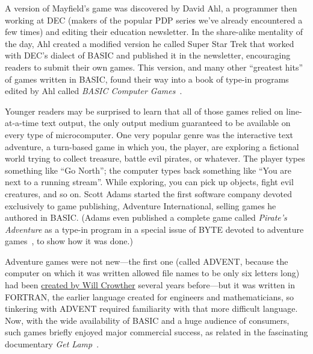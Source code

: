 A version of Mayfield's game
was discovered by David Ahl, a programmer
then working at DEC (makers of the popular PDP series we've already
encountered a few times) and editing their education newsletter.
In the share-alike mentality of the day, Ahl created a modified
version he called Super Star Trek that worked with DEC's dialect of
BASIC and published it in the
newsletter, encouraging readers to submit their own games.
This version, and many other ``greatest hits'' of games written in
BASIC, found their way into a book of type-in programs edited by Ahl called \emph{BASIC
Computer Games}~\cite{basic_computer_games}.


Younger readers may be surprised to learn that all of those games
relied on line-at-a-time text output, the only
output medium guaranteed to be available on every type of
microcomputer.
One very popular genre was the interactive text adventure,
a turn-based game in which you, the
player, are exploring a fictional world trying to collect treasure,
battle evil pirates, or whatever.
The player types something like ``Go North''; the computer types
back something like ``You are next to a running stream''.  While
exploring, you can pick up objects, fight evil creatures, and so on.
Scott Adams
started the first software company devoted exclusively to game
publishing, Adventure International, selling games he authored in BASIC.
(Adams even published a complete game called \emph{Pirate's Adventure}
as a type-in program in a special issue of BYTE devoted to adventure
games~\cite{byte80:adventure}, to show how it was done.)

\begin{tangent}
  Adventure games were not new---the first one (called ADVENT, because
  the computer on which it was written allowed file names to be only six
  letters long) had been
  \href{https://armandofox.blogspot.com/2007/08/the-original-original-adventure.html}{created
by Will Crowther} several years before---but it was written in
FORTRAN, the earlier language created for engineers and
mathematicians, so tinkering with ADVENT required familiarity with
that more difficult language.
Now, with the wide availability of BASIC and a huge audience of
consumers, such games briefly enjoyed major commercial success, as
related in the fascinating documentary \emph{Get
Lamp}~\cite{get_lamp}.
\end{tangent}

